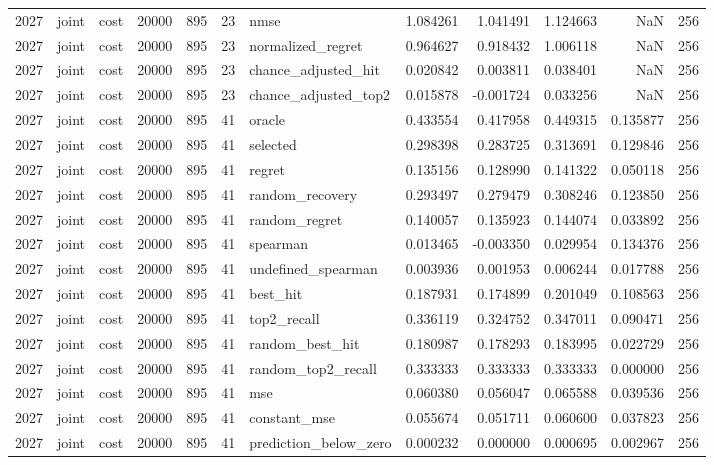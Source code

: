 \begin{tabular}{rllrrrlrrrrr}
2027 & joint & cost & 20000 & 895 & 23 & nmse & 1.084261 & 1.041491 & 1.124663 & NaN & 256 \\
2027 & joint & cost & 20000 & 895 & 23 & normalized_regret & 0.964627 & 0.918432 & 1.006118 & NaN & 256 \\
2027 & joint & cost & 20000 & 895 & 23 & chance_adjusted_hit & 0.020842 & 0.003811 & 0.038401 & NaN & 256 \\
2027 & joint & cost & 20000 & 895 & 23 & chance_adjusted_top2 & 0.015878 & -0.001724 & 0.033256 & NaN & 256 \\
2027 & joint & cost & 20000 & 895 & 41 & oracle & 0.433554 & 0.417958 & 0.449315 & 0.135877 & 256 \\
2027 & joint & cost & 20000 & 895 & 41 & selected & 0.298398 & 0.283725 & 0.313691 & 0.129846 & 256 \\
2027 & joint & cost & 20000 & 895 & 41 & regret & 0.135156 & 0.128990 & 0.141322 & 0.050118 & 256 \\
2027 & joint & cost & 20000 & 895 & 41 & random_recovery & 0.293497 & 0.279479 & 0.308246 & 0.123850 & 256 \\
2027 & joint & cost & 20000 & 895 & 41 & random_regret & 0.140057 & 0.135923 & 0.144074 & 0.033892 & 256 \\
2027 & joint & cost & 20000 & 895 & 41 & spearman & 0.013465 & -0.003350 & 0.029954 & 0.134376 & 256 \\
2027 & joint & cost & 20000 & 895 & 41 & undefined_spearman & 0.003936 & 0.001953 & 0.006244 & 0.017788 & 256 \\
2027 & joint & cost & 20000 & 895 & 41 & best_hit & 0.187931 & 0.174899 & 0.201049 & 0.108563 & 256 \\
2027 & joint & cost & 20000 & 895 & 41 & top2_recall & 0.336119 & 0.324752 & 0.347011 & 0.090471 & 256 \\
2027 & joint & cost & 20000 & 895 & 41 & random_best_hit & 0.180987 & 0.178293 & 0.183995 & 0.022729 & 256 \\
2027 & joint & cost & 20000 & 895 & 41 & random_top2_recall & 0.333333 & 0.333333 & 0.333333 & 0.000000 & 256 \\
2027 & joint & cost & 20000 & 895 & 41 & mse & 0.060380 & 0.056047 & 0.065588 & 0.039536 & 256 \\
2027 & joint & cost & 20000 & 895 & 41 & constant_mse & 0.055674 & 0.051711 & 0.060600 & 0.037823 & 256 \\
2027 & joint & cost & 20000 & 895 & 41 & prediction_below_zero & 0.000232 & 0.000000 & 0.000695 & 0.002967 & 256 \\

\end{tabular}
